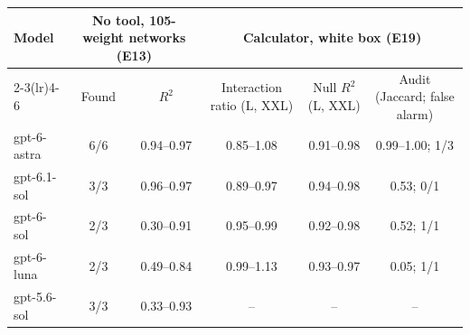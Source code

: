 \begin{tabular}{lccccc}
\toprule
Model & \multicolumn{2}{c}{No tool, 105-weight networks (E13)} & \multicolumn{3}{c}{Calculator, white box (E19)} \\
\cmidrule(lr){2-3}\cmidrule(lr){4-6}
 & Found & $R^2$ & Interaction ratio (L, XXL) & Null $R^2$ (L, XXL) & Audit (Jaccard; false alarm) \\
\midrule
gpt-6-astra & 6/6 & 0.94--0.97 & 0.85--1.08 & 0.91--0.98 & 0.99--1.00; 1/3 \\
gpt-6.1-sol & 3/3 & 0.96--0.97 & 0.89--0.97 & 0.94--0.98 & 0.53; 0/1 \\
gpt-6-sol & 2/3 & 0.30--0.91 & 0.95--0.99 & 0.92--0.98 & 0.52; 1/1 \\
gpt-6-luna & 2/3 & 0.49--0.84 & 0.99--1.13 & 0.93--0.97 & 0.05; 1/1 \\
gpt-5.6-sol & 3/3 & 0.33--0.93 & -- & -- & -- \\
\bottomrule
\end{tabular}
